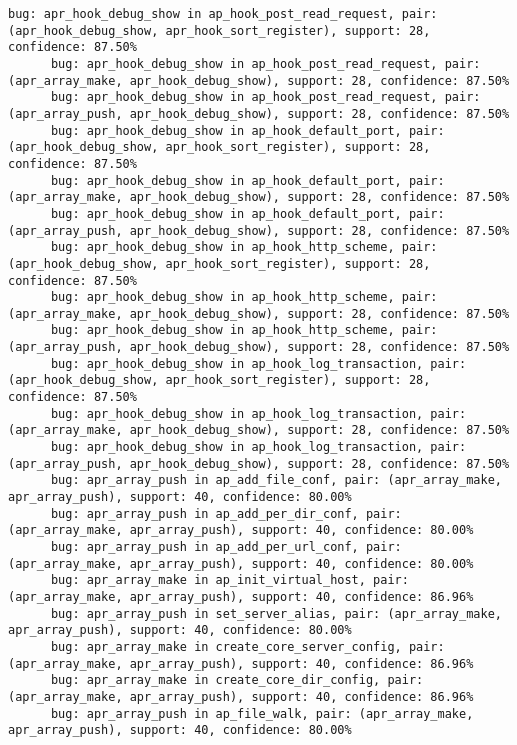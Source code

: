 \documentclass{article}
\begin{document}
\begin{enumerate}[(a)]
      \begin{lstlisting}[basicstyle=\tiny\ttfamily]
      bug: apr_hook_debug_show in ap_hook_post_read_request, pair: (apr_hook_debug_show, apr_hook_sort_register), support: 28, confidence: 87.50%
      bug: apr_hook_debug_show in ap_hook_post_read_request, pair: (apr_array_make, apr_hook_debug_show), support: 28, confidence: 87.50%
      bug: apr_hook_debug_show in ap_hook_post_read_request, pair: (apr_array_push, apr_hook_debug_show), support: 28, confidence: 87.50%
      bug: apr_hook_debug_show in ap_hook_default_port, pair: (apr_hook_debug_show, apr_hook_sort_register), support: 28, confidence: 87.50%
      bug: apr_hook_debug_show in ap_hook_default_port, pair: (apr_array_make, apr_hook_debug_show), support: 28, confidence: 87.50%
      bug: apr_hook_debug_show in ap_hook_default_port, pair: (apr_array_push, apr_hook_debug_show), support: 28, confidence: 87.50%
      bug: apr_hook_debug_show in ap_hook_http_scheme, pair: (apr_hook_debug_show, apr_hook_sort_register), support: 28, confidence: 87.50%
      bug: apr_hook_debug_show in ap_hook_http_scheme, pair: (apr_array_make, apr_hook_debug_show), support: 28, confidence: 87.50%
      bug: apr_hook_debug_show in ap_hook_http_scheme, pair: (apr_array_push, apr_hook_debug_show), support: 28, confidence: 87.50%
      bug: apr_hook_debug_show in ap_hook_log_transaction, pair: (apr_hook_debug_show, apr_hook_sort_register), support: 28, confidence: 87.50%
      bug: apr_hook_debug_show in ap_hook_log_transaction, pair: (apr_array_make, apr_hook_debug_show), support: 28, confidence: 87.50%
      bug: apr_hook_debug_show in ap_hook_log_transaction, pair: (apr_array_push, apr_hook_debug_show), support: 28, confidence: 87.50%
      bug: apr_array_push in ap_add_file_conf, pair: (apr_array_make, apr_array_push), support: 40, confidence: 80.00%
      bug: apr_array_push in ap_add_per_dir_conf, pair: (apr_array_make, apr_array_push), support: 40, confidence: 80.00%
      bug: apr_array_push in ap_add_per_url_conf, pair: (apr_array_make, apr_array_push), support: 40, confidence: 80.00%
      bug: apr_array_make in ap_init_virtual_host, pair: (apr_array_make, apr_array_push), support: 40, confidence: 86.96%
      bug: apr_array_push in set_server_alias, pair: (apr_array_make, apr_array_push), support: 40, confidence: 80.00%
      bug: apr_array_make in create_core_server_config, pair: (apr_array_make, apr_array_push), support: 40, confidence: 86.96%
      bug: apr_array_make in create_core_dir_config, pair: (apr_array_make, apr_array_push), support: 40, confidence: 86.96%
      bug: apr_array_push in ap_file_walk, pair: (apr_array_make, apr_array_push), support: 40, confidence: 80.00%

\end{lstlisting}
\end{enumerate}
\end{document}
